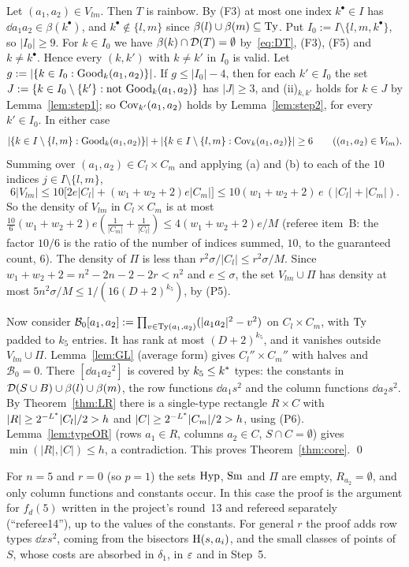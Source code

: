 Let $(a_1,a_2)\in V_{lm}$. Then $T$ is rainbow. By (F3) at most one index $k^\bullet\in I$ has $\dd{a_1}{a_2}\in\beta(k^\bullet)$,
and $k^\bullet\notin\{l,m\}$ since $\beta(l)\cup\beta(m)\subseteq\mathrm{Ty}$. Put $I_0:=I\setminus\{l,m,k^\bullet\}$, so $|I_0|\ge9$. For
$k\in I_0$ we have $\beta(k)\cap\mathcal{D}(T)=\emptyset$ by~\eqref{eq:DT}, (F3), (F5) and $k\ne k^\bullet$. Hence every
$(k,k')$ with $k\ne k'$ in $I_0$ is valid. Let $g:=|\{k\in I_0:\mathrm{Good}_k(a_1,a_2)\}|$. If $g\le|I_0|-4$, then for each
$k'\in I_0$ the set $J:=\{k\in I_0\setminus\{k'\}:\text{not }\mathrm{Good}_k(a_1,a_2)\}$ has $|J|\ge3$, and (ii)$_{k,k'}$ holds for
$k\in J$ by Lemma~\ref{lem:step1}; so $\mathrm{Cov}_{k'}(a_1,a_2)$ holds by Lemma~\ref{lem:step2}, for every $k'\in I_0$. In either case
\[
|\{k\in I\setminus\{l,m\}:\mathrm{Good}_k(a_1,a_2)\}|+|\{k\in I\setminus\{l,m\}:\mathrm{Cov}_k(a_1,a_2)\}|\ge6\qquad((a_1,a_2)\in V_{lm}).
\]
Summing over $(a_1,a_2)\in C_l\times C_m$ and applying (a) and (b) to each of the $10$ indices $j\in I\setminus\{l,m\}$,
\[
6|V_{lm}|\le10\bigl[2e|C_l|+(w_1+w_2+2)e|C_m|\bigr]\le10(w_1+w_2+2)\,e\,(|C_l|+|C_m|).
\]
So the density of $V_{lm}$ in $C_l\times C_m$ is at most $\frac{10}6(w_1+w_2+2)e(\frac1{|C_m|}+\frac1{|C_l|})\le4(w_1+w_2+2)e/M$
(referee item~B: the factor $10/6$ is the ratio of the number of indices summed, $10$, to the guaranteed count, $6$).
The density of $\Pi$ is less than $r^2\sigma/|C_l|\le r^2\sigma/M$. Since
$w_1+w_2+2=n^2-2n-2-2r<n^2$ and $e\le\sigma$, the set $V_{lm}\cup\Pi$ has density at most $5n^2\sigma/M\le1/(16(D+2)^{k_5})$, by (P5).

Now consider $\mathcal B_0[a_1,a_2]:=\prod_{v\in\mathrm{Ty}(a_1,a_2)}(|a_1a_2|^2-v^2)$ on $C_l\times C_m$, with $\mathrm{Ty}$ padded to $k_5$
entries. It has rank at most $(D+2)^{k_5}$, and it vanishes outside $V_{lm}\cup\Pi$. Lemma~\ref{lem:GL} (average form) gives
$C_l''\times C_m''$ with halves and $\mathcal B_0=0$. There $[\dd{a_1}{a_2}^2]$ is covered by $k_5\le k^{\ast}$ types: the constants
in $\mathcal{D}(S\cup B)\cup\beta(l)\cup\beta(m)$, the row functions $\dd{a_1}s^2$ and the column functions $\dd{a_2}s^2$. By
Theorem~\ref{thm:LR} there is a single-type rectangle $R\times C$ with $|R|\ge2^{-L^{\ast}}|C_l|/2>h$ and
$|C|\ge2^{-L^{\ast}}|C_m|/2>h$, using (P6). Lemma~\ref{lem:typeOR} (rows $a_1\in R$, columns $a_2\in C$, $S\cap C=\emptyset$) gives
$\min(|R|,|C|)\le h$, a contradiction. This proves Theorem~\ref{thm:core}. \qed

\begin{remark}
For $n=5$ and $r=0$ (so $p=1$) the sets $\mathrm{Hyp}$, $\mathrm{Sm}$ and $\Pi$ are empty, $R_{a_2}=\emptyset$, and only column functions
and constants occur. In this case the proof is the argument for $f_d(5)$ written in the project's round~13 and
refereed separately (``referee14''), up to the values of the constants. For general $r$ the proof adds
row types $\dd xs^2$, coming from the bisectors $\mathrm{H}(s,a_i)$, and the small classes of points of $S$, whose
costs are absorbed in $\delta_1$, in $\varepsilon$ and in Step~5.
\end{remark}
